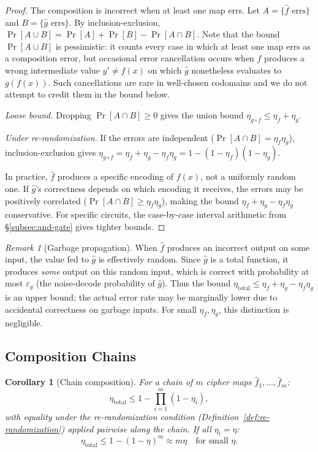 \documentclass[11pt]{article}
\theoremstyle{definition}
\theoremstyle{plain}
\newtheorem{corollary}[theorem]{Corollary}
\theoremstyle{remark}
\newtheorem{remark}{Remark}[section]
\newcommand{\fhat}{\hat{f}}
\newcommand{\ghat}{\hat{g}}
\begin{document}
\begin{proof}
The composition is incorrect when at least one map errs.  Let
$A = \{\fhat \text{ errs}\}$ and $B = \{\ghat \text{ errs}\}$.
By inclusion-exclusion,
$\Pr[A \cup B] = \Pr[A] + \Pr[B] - \Pr[A \cap B]$.
Note that the bound $\Pr[A \cup B]$ is pessimistic: it counts every
case in which at least one map errs as a composition error, but
occasional error cancellation occurs when $\fhat$ produces a wrong
intermediate value $y' \neq f(x)$ on which $\ghat$ nonetheless evaluates
to $g(f(x))$.  Such cancellations are rare in well-chosen codomains and
we do not attempt to credit them in the bound below.

\emph{Loose bound.}  Dropping $\Pr[A \cap B] \geq 0$ gives the union bound
$\eta_{g \circ f} \leq \eta_f + \eta_g$.

\emph{Under re-randomization.}
If the errors are independent ($\Pr[A \cap B] = \eta_f \eta_g$),
inclusion-exclusion gives
$\eta_{g \circ f} = \eta_f + \eta_g - \eta_f \eta_g
  = 1 - (1-\eta_f)(1-\eta_g)$.

In practice, $\fhat$ produces a specific encoding of $f(x)$, not a
uniformly random one.  If $\ghat$'s correctness depends on which encoding
it receives, the errors may be positively correlated
($\Pr[A \cap B] \geq \eta_f \eta_g$), making the bound
$\eta_f + \eta_g - \eta_f \eta_g$ conservative.
For specific circuits, the case-by-case interval arithmetic from
\S\ref{subsec:and-gate} gives tighter bounds.
\end{proof}

\begin{remark}[Garbage propagation]
When $\fhat$ produces an incorrect output on some input, the value fed to
$\ghat$ is effectively random.  Since $\ghat$ is a total function, it
produces \emph{some} output on this random input, which is correct with
probability at most $\varepsilon_g$ (the noise-decode probability of
$\ghat$).  Thus the bound
$\eta_{\mathrm{total}} \leq \eta_f + \eta_g - \eta_f \eta_g$ is an upper
bound; the actual error rate may be marginally lower due to accidental
correctness on garbage inputs.  For small $\eta_f, \eta_g$, this
distinction is negligible.
\end{remark}

\subsection{Composition Chains}

\begin{corollary}[Chain composition]
\label{cor:chain}
For a chain of $m$ cipher maps $\fhat_1, \ldots, \fhat_m$:
\begin{equation}
\eta_{\mathrm{total}} \leq 1 - \prod_{i=1}^{m}(1 - \eta_i),
\end{equation}
with equality under the re-randomization condition
(Definition~\ref{def:re-randomization}) applied pairwise along the
chain.  If all $\eta_i = \eta$:
\begin{equation}
\eta_{\mathrm{total}} \leq 1 - (1-\eta)^m \approx m\eta
\quad \text{for small } \eta.
\end{equation}
\end{corollary}
\end{document}
